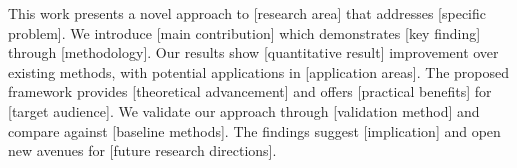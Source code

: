 This work presents a novel approach to [research area] that addresses [specific problem]. 
We introduce [main contribution] which demonstrates [key finding] through [methodology]. 
Our results show [quantitative result] improvement over existing methods, with potential applications in [application areas]. 
The proposed framework provides [theoretical advancement] and offers [practical benefits] for [target audience]. 
We validate our approach through [validation method] and compare against [baseline methods]. 
The findings suggest [implication] and open new avenues for [future research directions].
